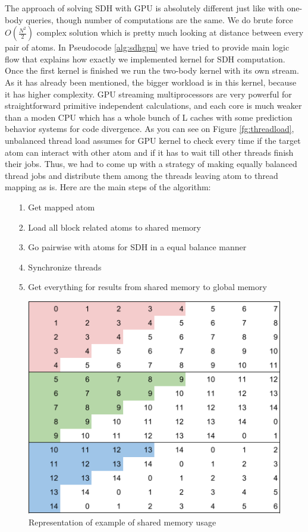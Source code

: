 \documentclass[12pt,letterpaper]{report}
\begin{document}
\noindent\hspace{3em} The approach of solving SDH with GPU is absolutely different just like with one-body queries, though number of computations are the same. We do brute force  $O(\frac{N^2}{2})$ complex solution which is pretty much looking at distance between every pair of atoms. In Pseudocode \ref{alg:sdhgpu} we have tried to provide main logic flow that explains how exactly we implemented kernel for SDH computation. 
Once the first kernel is finished we run the two-body kernel with its own stream. As it has already been mentioned, the bigger workload is in this kernel, because it has higher complexity. GPU streaming multiprocessors are very powerful for straightforward primitive independent calculations, and each core is much weaker than a moden CPU which has a whole bunch of L caches with some prediction behavior systems for code divergence. As you can see on Figure \ref{fg:threadload}, unbalanced thread load assumes for GPU kernel to check every time if the target atom can interact with other atom and if it has to wait till other threads finish their jobs. Thus, we had to come up with a strategy of making equally balanced thread jobs and distribute them among the threads leaving atom to thread mapping as is. 
\clearpage
\noindent\hspace{3em}Here are the main steps of the algorithm:
\begin{itemize}
\item[1.] Get mapped atom
\item[2.] Load all block related atoms to shared memory
\item[3.] Go pairwise with atoms for SDH in a equal balance manner
\item[4.] Synchronize threads
\item[5.] Get everything for results from shared memory to global memory
\end{itemize}


\begin{figure}
 \centerline{ \includegraphics[width=0.5\columnwidth]{images/sharedMem}}
 \caption{Representation of example of shared memory usage}
 \label{fg:sharedMem}
\end{figure}
\end{document}

